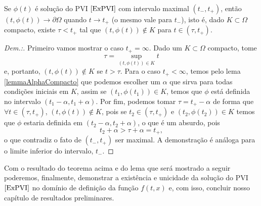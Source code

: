 \begin{theorem}
    Se $\phi(t)$ é solução do PVI $\eqref{ExPVI}$ com intervalo maximal $(t_-,t_+)$, então $(t,\phi(t))\to\partial\Omega$ quando $t\to t_+$ (o mesmo vale para $t_-$), isto é, dado $K\subset\Omega$ compacto, existe $\tau<t_+$ tal que $(t,\phi(t))\notin K$ para $t\in (\tau,t_+)$.
\end{theorem}
\begin{proof}[Dem.:]
    Primeiro vamos mostrar o caso $t_+=\infty$. Dado um $K\subset\Omega$ compacto, tome
    \begin{equation}
        \tau = \sup_{(t,\phi(t))\in K} t
    \end{equation}
    e, portanto, $(t,\phi(t))\notin K$ se $t>\tau$. Para o caso $t_+<\infty$, temos pelo lema \ref{lemmaAlphaCompacto} que podemos escolher um $\alpha$ que sirva para todas condições iniciais em $K$, assim se $(t_1,\phi(t_1))\in K$, temos que $\phi$ está definida no intervalo $(t_1-\alpha,t_1+\alpha)$. Por fim, podemos tomar $\tau=t_+ - \alpha$ de forma que $\forall t\in(\tau,t_+)$, $(t,\phi(t))\notin K$, pois se $t_2\in(\tau,t_+)$ e $(t_2,\phi(t_2))\in K$ temos que $\phi$ estaria definida em $(t_2-\alpha,t_2+\alpha)$, o que é um absurdo, pois
    \begin{equation}
        t_2+\alpha > \tau + \alpha = t_+,
    \end{equation}
    o que contradiz o fato de $(t_-,t_+)$ ser maximal. A demonstração é análoga para o limite inferior do intervalo, $t_-$.
\end{proof}

Com o resultado do teorema acima e do lema que será mostrado a seguir poderemos, finalmente, demonstrar a existência e unicidade da solução do PVI $\eqref{ExPVI}$ no domínio de definição da função $f(t,x)$ e, com isso, concluir nosso capítulo de resultados preliminares.

